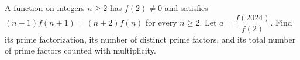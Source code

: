 A function on integers $n\ge2$ has $f(2)\ne0$ and satisfies $(n-1)f(n+1)=(n+2)f(n)$ for every $n\ge2$. Let $a=\dfrac{f(2024)}{f(2)}$. Find its prime factorization, its number of distinct prime factors, and its total number of prime factors counted with multiplicity.
